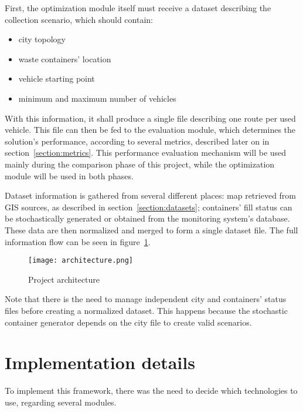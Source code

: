 First, the optimization module itself must receive a dataset describing the
collection scenario, which should contain:

\begin{itemize}
  \item city topology
  \item waste containers' location
  \item vehicle starting point
  \item minimum and maximum number of vehicles
\end{itemize}

With this information, it shall produce a single file describing one route per
used vehicle. This file can then be fed to the evaluation module, which
determines the solution's performance, according to several metrics, described
later on in section~\ref{section:metrics}. This performance evaluation
mechanism will be used mainly during the comparison phase of this project,
while the optimization module will be used in both phases.

Dataset information is gathered from several different places: map
retrieved from GIS sources, as described in
section~\ref{section:datasets}; containers' fill status can be stochastically
generated or obtained from the monitoring system's database. These data are
then normalized and merged to form a single dataset file. The full information
flow can be seen in figure~\ref{fig:architecture}.

\begin{figure}[H]
  \begin{center}
    \leavevmode
    \texttt{[image: architecture.png]}
    \caption{Project architecture}
    \label{fig:architecture}
  \end{center}
\end{figure}

Note that there is the need to manage independent city and containers' status
files before creating a normalized dataset. This happens because the stochastic
container generator depends on the city file to create valid scenarios.

\section{Implementation details}
\label{section:languages}

To implement this framework, there was the need to decide which technologies to
use, regarding several modules.

